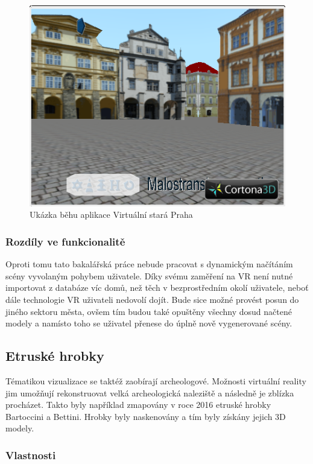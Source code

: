 \documentclass[thesis=B,czech]{FITthesis}[2012/06/26]
\begin{document}
	
	\begin{figure}
  		\includegraphics{vsp.png}
  		\caption{Ukázka běhu aplikace Virtuální stará Praha}
  		\label{fig:vsp1}
	\end{figure}

        \subsubsection{Rozdíly ve funkcionalitě}
        
        Oproti tomu tato bakalářská práce nebude pracovat s dynamickým načítáním scény vyvolaným pohybem uživatele. Díky svému zaměření na VR není nutné importovat z databáze víc domů, než těch v bezprostředním okolí uživatele, neboť dále technologie VR uživateli nedovolí dojít. Bude sice možné provést posun do jiného sektoru města, ovšem tím budou také opuštěny všechny dosud načtené modely a namísto toho se uživatel přenese do úplně nově vygenerované scény.


	
	\subsection{Etruské hrobky}
	
	Tématikou vizualizace se taktéž zaobírají archeologové. Možnosti virtuální reality jim umožňují rekonstruovat velká archeologická naleziště a následně je zblízka procházet. Takto byly například zmapovány v roce 2016 etruské hrobky Bartoccini a Bettini. Hrobky byly naskenovány a tím byly získány jejich 3D modely. 

        \subsubsection{Vlastnosti}	
	
\end{document}
